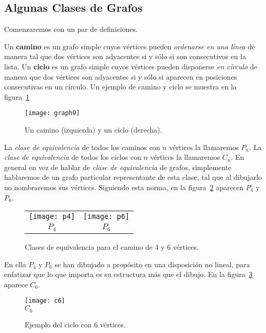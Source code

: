 \subsection{Algunas Clases de Grafos}

Comenzaremos con un par de definiciones.
\begin{definicion}
Un {\bf camino} es un grafo simple cuyos vértices pueden \emph{ordenarse en una linea} de manera tal que dos vértices son adyacentes si y sólo si son consecutivos en la lista.
Un {\bf ciclo} es un grafo simple cuyos vértices pueden disponerse \emph{en círculo} de manera que dos vértices son adyacentes si y sólo si aparecen en posiciones consecutivas en un círculo.
Un ejemplo de camino y ciclo se muestra en la figura~\ref{fig:graph9}
\begin{figure}[h!]
\centering
\texttt{[image: graph9]}\\
\caption{Un camino (izquierda) y un ciclo (derecha).}
\label{fig:graph9}
\end{figure}
\end{definicion}

\begin{definicion}
La \emph{clase de equivalencia} de todos los caminos con $n$ vértices la llamaremos $P_n$. 
La \emph{clase de equivalencia} de todos los ciclos con $n$ vértices la llamaremos $C_n$.
En general en vez de hablar de \emph{clase de equivalencia} de grafos, simplemente hablaremos de un grafo particular representante de esta clase, tal que al dibujarlo no nombraremos sus vértices.
Siguiendo esta norma, en la figura~\ref{fig:paths} aparecen $P_4$ y $P_6$.
\begin{figure}[h!]
\centering
\begin{tabular}{cc}
\texttt{[image: p4]}\hspace*{3em} &  \texttt{[image: p6]} \\
$P_4$\hspace*{3em} & $P_6$
\end{tabular}
\caption{Clases de equivalencia para el camino de 4 y 6 vértices.}
\label{fig:paths}
\end{figure}
En ella $P_4$ y $P_6$ se han dibujado a propósito en una disposición no lineal, para enfatizar que lo que importa es su estructura más que el dibujo.
En la figura~\ref{fig:cycle} aparece $C_6$.
\begin{figure}[h!]
\centering
\texttt{[image: c6]}\\
$C_6$
\caption{Ejemplo del ciclo con 6 vértices.}
\label{fig:cycle}
\end{figure}
\end{definicion}

